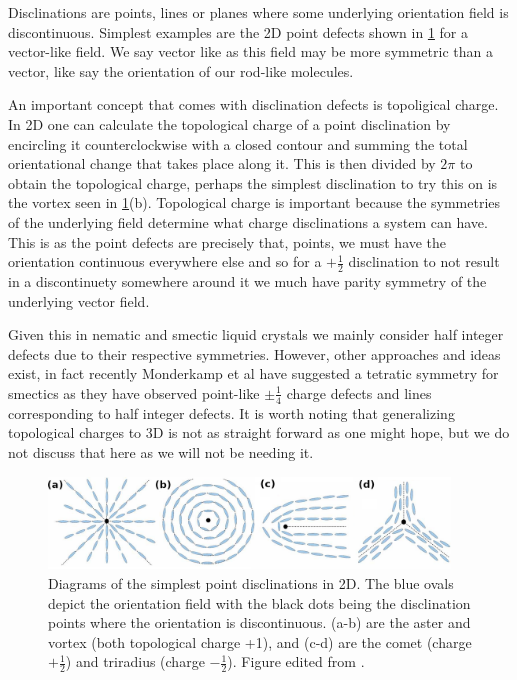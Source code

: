\documentclass[12pt]{article}
\begin{document}
    Disclinations are points, lines or planes where some underlying orientation field is discontinuous.
    Simplest examples are the 2D point defects shown in \cref{fig:defects} for a vector-like field.
    We say vector like as this field may be more symmetric than a vector, like say the orientation of our rod-like molecules.

    An important concept that comes with disclination defects is topoligical charge.
    In 2D one can calculate the topological charge of a point disclination by encircling it counterclockwise with a closed contour and summing the total orientational change that takes place along it.
    This is then divided by $2\pi$ to obtain the topological charge, perhaps the simplest disclination to try this on is the vortex seen in \cref{fig:defects}(b).
    Topological charge is important because the symmetries of the underlying field determine what charge disclinations a system can have.
    This is as the point defects are precisely that, points, we must have the orientation continuous everywhere else and so for a $+\frac{1}{2}$ disclination to not result in a discontinuety somewhere around it we much have parity symmetry of the underlying vector field.

    Given this in nematic and smectic liquid crystals we mainly consider half integer defects due to their respective symmetries.
    However, other approaches and ideas exist, in fact recently Monderkamp et al\cite{monderkampTopologyOrientationalDefects2021,a.monderkampTopologicalFineStructure2022} have suggested a tetratic symmetry for smectics as they have observed point-like $\pm\frac{1}{4}$ charge defects and lines corresponding to half integer defects.
    It is worth noting that generalizing topological charges to 3D is not as straight forward as one might hope, but we do not discuss that here as we will not be needing it.

    \begin{figure}[t]
        \begin{center}
            \includegraphics[width=0.95\textwidth]{figures/nematic_defects.png}
        \end{center}
        \caption{
            Diagrams of the simplest point disclinations in 2D.
            The blue ovals depict the orientation field with the black dots being the disclination points where the orientation is discontinuous.
            (a-b) are the aster and vortex (both topological charge +1), and (c-d) are the comet (charge $+\frac{1}{2}$) and triradius (charge $-\frac{1}{2}$). Figure edited from \cite{foffanoDynamicsColloidalIntrusions2014}.
        }\label{fig:defects}
    \end{figure}
\end{document}
